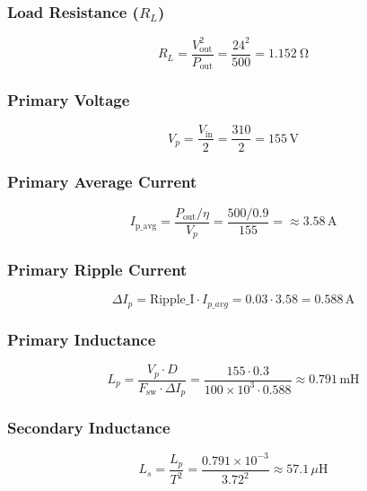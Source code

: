 \subsubsection*{Load Resistance (\(R_L\))}
\begin{equation}
R_L = \frac{V_{\text{out}}^2}{P_{\text{out}}} = \frac{24^2}{500} = \boxed{\SI{1.152}{\ohm}}
\end{equation}

\subsubsection*{Primary Voltage}
\begin{equation}
 V_p = \frac{V_{\text{in}}}{2} = \frac{310}{2} = \boxed{155\,\text{V}}
\end{equation}

\subsubsection*{Primary Average Current}
\begin{equation}
    I_{\text{p\_avg}} = \frac{P_{\text{out}}/\eta}{V_p} = \frac{500/0.9}{155} = \approx \boxed{3.58\,\text{A}}
\end{equation}

\subsubsection*{Primary Ripple Current}
\begin{equation}
   \Delta I_p = \text{Ripple\_I} \cdot I_{p\_avg} = 0.03 \cdot 3.58 = \boxed{0.588\,\text{A}}
\end{equation}

\subsubsection*{Primary Inductance}
\begin{equation}
    L_p = \frac{V_p \cdot D}{F_{\text{sw}} \cdot \Delta I_p} = \frac{155 \cdot 0.3}{100 \times 10^3 \cdot 0.588} \approx \boxed{0.791\,\text{mH}}
\end{equation}

\subsubsection*{Secondary Inductance}
\begin{equation}
    L_s = \frac{L_p}{T^2} = \frac{0.791 \times 10^{-3}}{3.72^2} \approx \boxed{57.1\,\mu\text{H}}
\end{equation}

